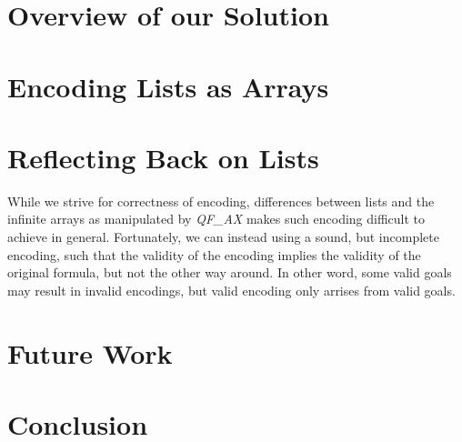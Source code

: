 \documentclass[10pt]{article}
\begin{document}
\section{Overview of our Solution}




\section{Encoding Lists as Arrays}





\section{Reflecting Back on Lists}
While we strive for correctness of encoding, differences between lists
and the infinite arrays as manipulated by \emph{QF\_AX} makes such encoding difficult to achieve in general. 
Fortunately, we can instead using a sound, but incomplete encoding, such that the validity 
of the encoding implies the validity of the original formula, but not the other way around.
In other word, some valid goals may result in invalid encodings, but valid encoding only arrises from valid goals.






\section{Future Work}



\section{Conclusion}
\end{document}
